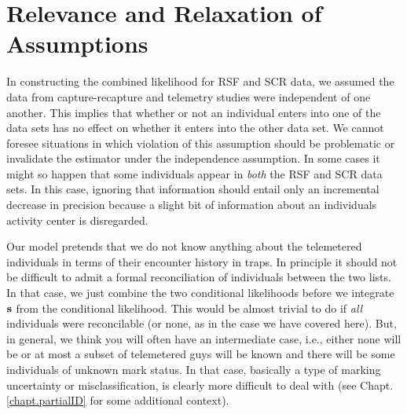 






























\section{Relevance and Relaxation of Assumptions}


In constructing the combined likelihood for RSF and SCR data, we
assumed the data from capture-recapture and telemetry studies were
independent of one another. This implies that whether or not an
individual enters into one of the data sets has no effect on whether
it enters into the other data set.  We cannot foresee situations in
which violation of this assumption should be problematic or invalidate
the estimator under the independence assumption.  In some cases it
might so happen that some individuals appear in {\it both} the RSF and
SCR data sets. In this case, ignoring that information should entail
only an incremental decrease in precision because a slight bit of
information about an individuals activity center is disregarded.

 Our model pretends that we do not know anything
about the telemetered individuals in terms of their encounter history
in traps. In principle it should not be difficult to admit a formal
reconciliation of individuals between the two lists. In that case, we
just combine the two conditional likelihoods before we integrate ${\bf
  s}$ from the conditional likelihood. This would be almost trivial to
do if {\it all} individuals were reconcilable (or none, as in the case
we have covered here). But, in general, we think you will often have
an intermediate case, i.e., either none will be or at most a subset
of telemetered guys will be known and there will be some individuals
of unknown mark status. 
In that case, basically a type of marking uncertainty or
misclassification, is clearly more difficult to deal with 
(see
Chapt. \ref{chapt.partialID} for some additional context).

